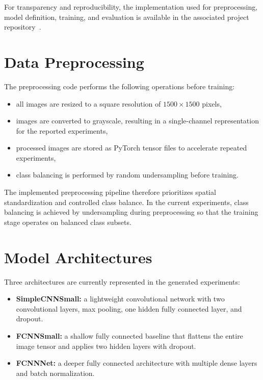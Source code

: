 \documentclass[12pt]{report}
\begin{document}
For transparency and reproducibility, the implementation used for preprocessing, model definition, training, and evaluation is available in the associated project repository~\cite{rajgithub2026}.

\section{Data Preprocessing}

The preprocessing code performs the following operations before training:

\begin{itemize}
    \item all images are resized to a square resolution of \(1500 \times 1500\) pixels,
    \item images are converted to grayscale, resulting in a single-channel representation for the reported experiments,
    \item processed images are stored as PyTorch tensor files to accelerate repeated experiments,
    \item class balancing is performed by random undersampling before training.
\end{itemize}

The implemented preprocessing pipeline therefore prioritizes spatial standardization and controlled class balance. In the current experiments, class balancing is achieved by undersampling during preprocessing so that the training stage operates on balanced class subsets.

\section{Model Architectures}

Three architectures are currently represented in the generated experiments:

\begin{itemize}
    \item \textbf{SimpleCNNSmall:} a lightweight convolutional network with two convolutional layers, max pooling, one hidden fully connected layer, and dropout.
    \item \textbf{FCNNSmall:} a shallow fully connected baseline that flattens the entire image tensor and applies two hidden layers with dropout.
    \item \textbf{FCNNNet:} a deeper fully connected architecture with multiple dense layers and batch normalization.
\end{itemize}
\end{document}
